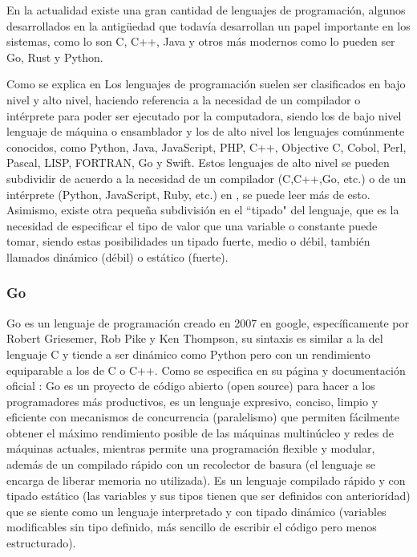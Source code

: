 En la actualidad existe una gran cantidad de lenguajes de programación, algunos
desarrollados en la antigüedad que todavía desarrollan un papel importante en
los sistemas, como lo son C, C++, Java y otros más modernos como lo pueden ser
Go, Rust y Python.

Como se explica en \textcite{javaTpoint}
Los lenguajes de programación suelen ser clasificados en bajo nivel y alto nivel,
haciendo referencia a la necesidad de un compilador o intérprete para poder ser
ejecutado por la computadora, siendo los de bajo nivel lenguaje de máquina o
ensamblador y los de alto nivel los lenguajes comúnmente conocidos, como
Python, Java, JavaScript, PHP, C++, Objective C, Cobol, Perl, Pascal, LISP,
FORTRAN, Go y Swift. Estos lenguajes de alto nivel se pueden subdividir
de acuerdo a la necesidad de un compilador (C,C++,Go, etc.) o de un intérprete
(Python, JavaScript, Ruby, etc.) en \textcite{LenguajesCompiladosEInterpretados}, se
puede leer más de esto. Asimismo, existe otra pequeña subdivisión en el ``tipado"
del lenguaje, que es la necesidad de especificar el tipo de valor que una
variable o constante puede tomar, siendo estas posibilidades un tipado fuerte,
medio o débil, también llamados dinámico (débil) o estático (fuerte).


\subsubsection{Go}
Go es un lenguaje de programación creado en 2007 en google, específicamente por
Robert Griesemer, Rob Pike y Ken Thompson, su sintaxis es similar a la del lenguaje
C y tiende a ser dinámico como Python pero con un rendimiento equiparable a los
de C o C++. Como se especifica en su página y documentación oficial
\textcite{GolangDocumentacion}: Go es un proyecto de código abierto (open source)
para hacer a los programadores más productivos, es un lenguaje expresivo, conciso,
limpio y eficiente con mecanismos de concurrencia (paralelismo) que permiten fácilmente
obtener el máximo rendimiento posible de las máquinas multinúcleo y redes de máquinas
actuales, mientras permite una programación flexible y modular, además de un compilado
rápido con un recolector de basura (el lenguaje se encarga de liberar memoria
no utilizada).
Es un lenguaje compilado rápido y con tipado estático (las variables y sus tipos tienen que
ser definidos con anterioridad) que se siente como un lenguaje interpretado y
con tipado dinámico (variables modificables sin tipo definido, más sencillo de
escribir el código pero menos estructurado).

